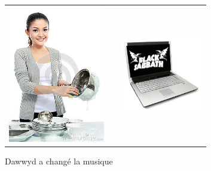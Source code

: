 \documentclass{beamer}
\begin{document}
\begin{frame}
\begin{figure}
    \caption{Dawwyd a changé la musique}
    \begin{tabular}{ccc}
        \includegraphics[height=6cm]{mains_mouillees} & & \includegraphics[height=3.2cm]{laptop_music_2}
    \end{tabular}
\end{figure}

\end{frame}
\end{document}
